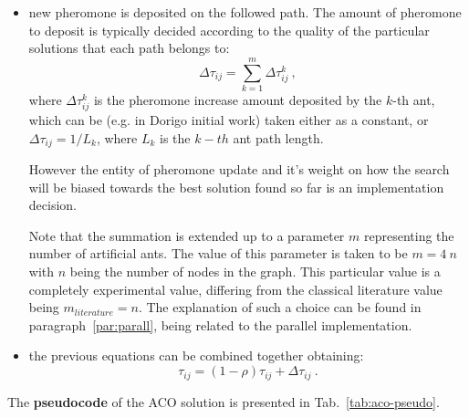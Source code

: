 \documentclass[10pt]{article}
\begin{document}
\begin{itemize}
\begin{itemize}
\item new pheromone is deposited on the followed path. The  amount  of  pheromone  to  deposit  is  typically decided  according  to  the  quality  of  the particular  solutions  that  each  path  belongs  to:
\begin{equation}
\Delta \tau_{ij}= \sum_{k=1}^{m} \Delta \tau_{ij}^k ~,
\label{eq:delta-tau}
\end{equation} 
where $\Delta \tau_{ij}^k$ is the pheromone increase amount deposited by the $k$-th ant, which can be (e.g. in Dorigo initial work) taken either as a constant, or $\Delta \tau_{ij}= 1/L_k$, where $L_k$ is the $k-th$ ant path length.

However  the entity of  pheromone  update and  it's weight on how the search will be biased towards the best solution found so far is an implementation decision.

Note that the summation is extended up to a parameter $m$ representing the number of artificial ants. The value of this parameter is taken to be $m= 4~n$ with $n$ being the number of nodes in the graph. This particular value is a completely experimental value, differing from the classical literature value being $m_{literature}=n$.
The explanation of such a choice can be found in paragraph~\ref{par:parall}, being related to the parallel implementation.
\item the previous equations can be combined together obtaining:
\begin{equation}
\tau_{ij}= (1-\rho) \tau_{ij} + \Delta \tau_{ij} ~.
\label{eq:aco-update}
\end{equation}
\end{itemize}
\end{itemize}

The \textbf{pseudocode} of the ACO solution is presented in Tab.~\ref{tab:aco-pseudo}.
\end{document}
